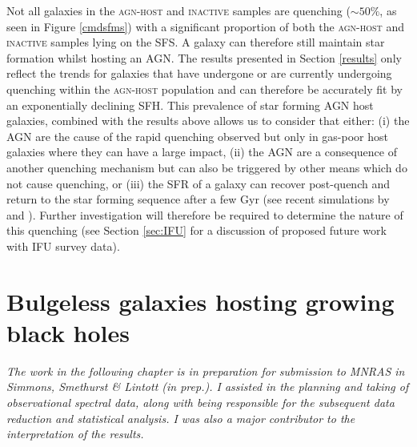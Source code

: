 Not all galaxies in the \textsc{agn-host} and \textsc{inactive} samples are quenching ($\sim50\%$, as seen in Figure \ref{cmdsfms}) with a significant proportion of both the \textsc{agn-host} and \textsc{inactive} samples lying on the SFS. A galaxy can therefore still maintain star formation whilst hosting an AGN. The results presented in Section \ref{results} only reflect the trends for galaxies that have undergone or are currently undergoing quenching within the \textsc{agn-host} population and can therefore be accurately fit by an exponentially declining SFH. This prevalence of star forming AGN host galaxies, combined with the results above allows us to consider that either: (i)  the AGN are the cause of the rapid quenching observed but only in gas-poor host galaxies where they can have a large impact, (ii) the AGN are a consequence of another quenching mechanism but can also be triggered by other means which do not cause quenching, or (iii) the SFR of a galaxy can recover post-quench and return to the star forming sequence after a few Gyr (see recent simulations by \citealt{pontzen16} and \citealt{sparre16}). Further investigation will therefore be required to determine the nature of this quenching (see Section \ref{sec:IFU} for a discussion of proposed future work with IFU survey data).


 

\newpage

\section{Bulgeless galaxies hosting growing black holes}\label{sec:intbulgeless}

\emph{The work in the following chapter is in preparation for submission to MNRAS in Simmons, Smethurst \& Lintott (in prep.). I assisted in the planning and taking of observational spectral data, along with being responsible for the subsequent data reduction and statistical analysis. I was also a major contributor to the interpretation of the results.}


